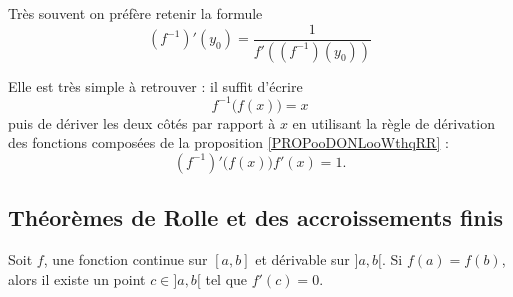 \begin{normaltext}
	Très souvent on préfère retenir la formule
	\begin{equation}\label{EqWWAooBRFNsv}
		(f^{-1})'(y_0) = \frac{1}{f'\left((f^{-1})(y_0)\right)}
	\end{equation}

	Elle est très simple à retrouver : il suffit d'écrire
	\begin{equation}
		f^{-1}\big( f(x) \big)=x
	\end{equation}
	puis de dériver les deux côtés par rapport à \( x\) en utilisant la règle de dérivation des fonctions composées de la proposition \ref{PROPooDONLooWthqRR} :
	\begin{equation}
		(f^{-1})'\big( f(x) \big)f'(x)=1.
	\end{equation}
\end{normaltext}

\subsection{Théorèmes de Rolle et des accroissements finis}

\begin{theorem}       \label{ThoRolle}
	Soit \( f\), une fonction continue sur \( [a,b]\) et dérivable sur \( ]a,b[\). Si \( f(a)=f(b)\), alors il existe un point \( c\in]a,b[\) tel que \( f'(c)=0\).
\end{theorem}

